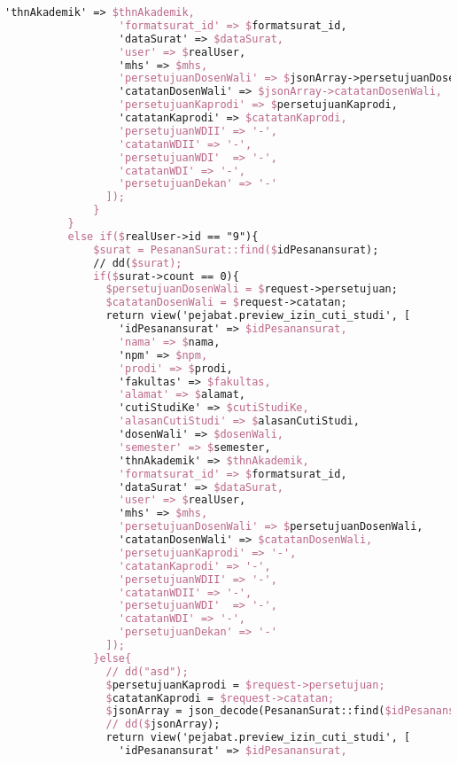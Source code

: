 \begin{lstlisting}[language=tex,basicstyle=\tiny,caption=PesanansuratController.php]
                  'thnAkademik' => $thnAkademik,
                  'formatsurat_id' => $formatsurat_id,
                  'dataSurat' => $dataSurat,
                  'user' => $realUser,
                  'mhs' => $mhs,
                  'persetujuanDosenWali' => $jsonArray->persetujuanDosenWali,
                  'catatanDosenWali' => $jsonArray->catatanDosenWali,
                  'persetujuanKaprodi' => $persetujuanKaprodi,
                  'catatanKaprodi' => $catatanKaprodi,
                  'persetujuanWDII' => '-',
                  'catatanWDII' => '-',
                  'persetujuanWDI'  => '-',
                  'catatanWDI' => '-',
                  'persetujuanDekan' => '-'
                ]);
              }
          }
          else if($realUser->id == "9"){
              $surat = PesananSurat::find($idPesanansurat);
              // dd($surat);
              if($surat->count == 0){
                $persetujuanDosenWali = $request->persetujuan;
                $catatanDosenWali = $request->catatan;
                return view('pejabat.preview_izin_cuti_studi', [
                  'idPesanansurat' => $idPesanansurat,
                  'nama' => $nama,
                  'npm' => $npm,
                  'prodi' => $prodi,
                  'fakultas' => $fakultas,
                  'alamat' => $alamat,
                  'cutiStudiKe' => $cutiStudiKe,
                  'alasanCutiStudi' => $alasanCutiStudi,
                  'dosenWali' => $dosenWali,
                  'semester' => $semester,
                  'thnAkademik' => $thnAkademik,
                  'formatsurat_id' => $formatsurat_id,
                  'dataSurat' => $dataSurat,
                  'user' => $realUser,
                  'mhs' => $mhs,
                  'persetujuanDosenWali' => $persetujuanDosenWali,
                  'catatanDosenWali' => $catatanDosenWali,
                  'persetujuanKaprodi' => '-',
                  'catatanKaprodi' => '-',
                  'persetujuanWDII' => '-',
                  'catatanWDII' => '-',
                  'persetujuanWDI'  => '-',
                  'catatanWDI' => '-',
                  'persetujuanDekan' => '-'
                ]);
              }else{
                // dd("asd");
                $persetujuanKaprodi = $request->persetujuan;
                $catatanKaprodi = $request->catatan;
                $jsonArray = json_decode(PesananSurat::find($idPesanansurat)->dataSurat);
                // dd($jsonArray);
                return view('pejabat.preview_izin_cuti_studi', [
                  'idPesanansurat' => $idPesanansurat,

\end{lstlisting}
